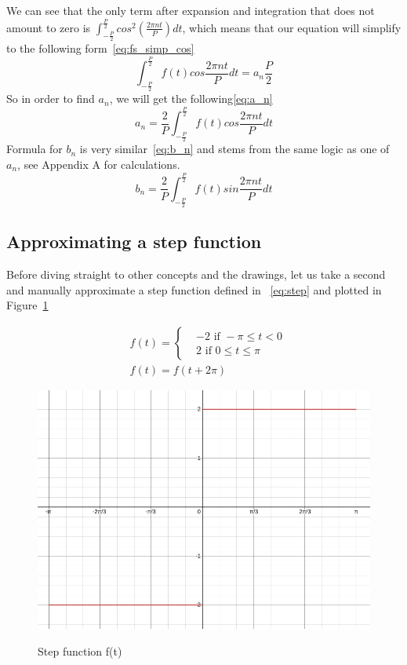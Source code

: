 \documentclass[titlepage]{article}
\begin{document}
    We can see that the only term after expansion and integration that does not 
    amount to zero is $\int_{-\frac{P}{2}}^{\frac{P}{2}}cos^2(\frac{2\pi nt}{P})dt$,
    which means that our equation will simplify to the following form~\eqref{eq:fs_simp_cos}
    \begin{equation}\label{eq:fs_simp_cos}
        \int_{-\frac{P}{2}}^{\frac{P}{2}}f(t)cos\frac{2\pi nt}{P}dt = a_n\frac{P}{2}
    \end{equation}
    So in order to find $a_n$, we will get the following\eqref{eq:a_n}
    \begin{equation}\label{eq:a_n}
        a_n = \frac{2}{P}\int_{-\frac{P}{2}}^{\frac{P}{2}}f(t)cos\frac{2\pi nt}{P}dt
    \end{equation}
    Formula for $b_n$ is very similar~\eqref{eq:b_n} and stems from the same logic as one of 
    $a_n$, see Appendix A for calculations.
    \begin{equation}\label{eq:b_n}
        b_n = \frac{2}{P}\int_{-\frac{P}{2}}^{\frac{P}{2}}f(t)sin\frac{2\pi nt}{P}dt
    \end{equation}

\subsection{Approximating a step function}
    
    Before diving straight to other concepts and the drawings, let us 
    take a second and manually approximate a step function defined in ~\eqref{eq:step}
    and plotted in Figure~\ref{fig:step_func}

    \begin{equation}\label{eq:step}
    \begin{split}
         &f(t) = 
        \begin{cases} 
            & -2 \text{ if } -\pi \leq t < 0 \\
            & 2 \text{ if }  0 \leq t \leq \pi
        \end{cases} \\
        & f(t) = f(t + 2\pi) 
    \end{split}
    \end{equation}

    \begin{figure}[H]
        \caption{Step function f(t)}
        \centering
        \includegraphics[width=0.5\linewidth]{step_func}
        \label{fig:step_func}
    \end{figure} 
\end{document}
